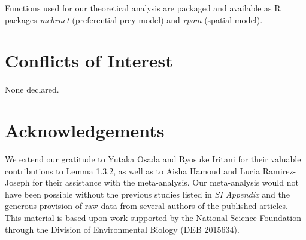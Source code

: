 \documentclass[11pt, class=article, crop=false]{standalone}
\begin{document}
Functions used for our theoretical analysis are packaged and available as R packages \textit{mcbrnet} (preferential prey model) and \textit{rpom} (spatial model).

\section{Conflicts of Interest}

None declared.

\section{Acknowledgements}

We extend our gratitude to Yutaka Osada and Ryosuke Iritani for their valuable contributions to Lemma 1.3.2, as well as to Aisha Hamoud and Lucia Ramirez-Joseph for their assistance with the meta-analysis.
Our meta-analysis would not have been possible without the previous studies listed in \textit{SI Appendix} and the generous provision of raw data from several authors of the published articles.
This material is based upon work supported by the National Science Foundation through the Division of Environmental Biology (DEB 2015634).


\end{document}
